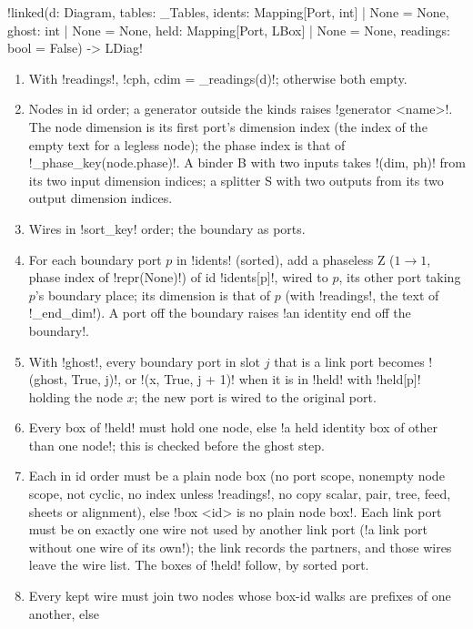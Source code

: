 {{{\begin{signature}
\lexpy!linked(d: Diagram, tables: _Tables, idents: Mapping[Port, int] | None = None, ghost: int | None = None, held: Mapping[Port, LBox] | None = None, readings: bool = False) -> LDiag!
\end{signature}
\begin{algorithm}\label{alg:lean-export-linked}
\begin{enumerate}
\item With \lexcode!readings!, \lexpy!cph, cdim = _readings(d)!; otherwise both empty.
\item Nodes in id order; a generator outside the kinds raises \lexcode!generator <name>!. The node
dimension is its first port's dimension index (the index of the empty text for a legless node);
the phase index is that of \lexpy!_phase_key(node.phase)!. A binder B with two inputs takes
\lexcode!(dim, ph)! from its two input dimension indices; a splitter S with two outputs from its two
output dimension indices.
\item Wires in \lexpy!sort_key! order; the boundary as ports.
\item For each boundary port $p$ in \lexcode!idents! (sorted), add a phaseless Z ($1\to1$, phase
index of \lexpy!repr(None)!) of id \lexcode!idents[p]!, wired to $p$, its other port taking $p$'s
boundary place; its dimension is that of $p$ (with \lexcode!readings!, the text of
\lexpy!_end_dim!). A port off the boundary raises \lexcode!an identity end off the boundary!.
\item With \lexcode!ghost!, every boundary port in slot $j$ that is a link port becomes
\lexcode!(ghost, True, j)!, or \lexcode!(x, True, j + 1)! when it is in \lexcode!held! with \lexcode!held[p]!
holding the node $x$; the new port is wired to the original port.
\item Every box of \lexcode!held! must hold one node, else
\lexcode!a held identity box of other than one node!; this is checked before the ghost step.
\item Each \bbox in id order must be a plain node box (no port scope, nonempty node scope, not
cyclic, no index unless \lexcode!readings!, no copy scalar, pair, tree, feed, sheets or alignment),
else \lexcode!box <id> is no plain node box!. Each link port must be on exactly one wire not used by
another link port (\lexcode!a link port without one wire of its own!); the link records the
partners, and those wires leave the wire list. The boxes of \lexcode!held! follow, by sorted port.
\item Every kept wire must join two nodes whose box-id walks are prefixes of one another, else

\end{enumerate}
\end{algorithm}}}}
